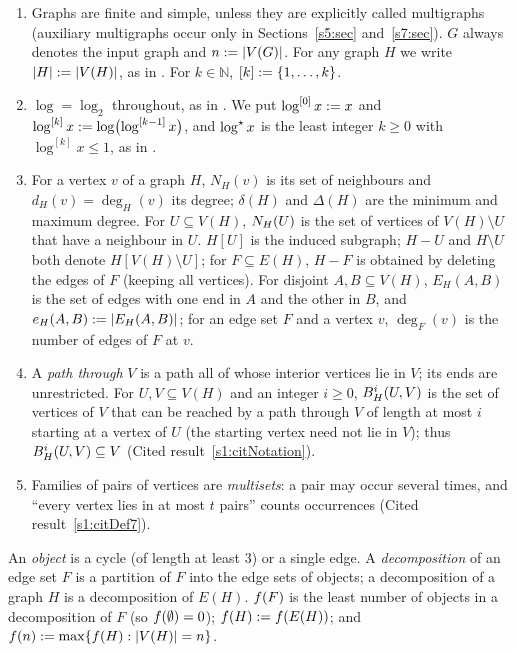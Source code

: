 \begin{convention}\label{s1:convGraphs}
\begin{enumerate}
\item[(a)] Graphs are finite and simple, unless they are explicitly called
multigraphs (auxiliary multigraphs occur only in Sections~\ref{s5:sec}
and~\ref{s7:sec}). $G$ always denotes the input graph and $n\mathrel{:=}|V(G)|$. For
any graph $H$ we write $|H|\mathrel{:=}|V(H)|$, as in \cite{BM}. For $k\in\mathbb N$,
$[k]\mathrel{:=}\{1,\dots,k\}$.
\item[(b)] $\log=\log_2$ throughout, as in \cite{BM}. We put
$\log^{[0]}x\mathrel{:=} x$ and $\log^{[k]}x\mathrel{:=}\log\bigl(\log^{[k-1]}x\bigr)$, and
$\log^{\star} x$ is the least integer $k\ge0$ with $\log^{[k]}x\le1$, as in
\cite{BM}.
\item[(c)] For a vertex $v$ of a graph $H$, $N_H(v)$ is its set of neighbours
and $d_H(v)=\deg_H(v)$ its degree; $\delta(H)$ and $\Delta(H)$ are the minimum
and maximum degree. For $U\subseteq V(H)$, $N_H(U)$ is the set of vertices of
$V(H)\setminus U$ that have a neighbour in $U$. $H[U]$ is the induced subgraph;
$H-U$ and $H\setminus U$ both denote $H[V(H)\setminus U]$; for
$F\subseteq E(H)$, $H-F$ is obtained by deleting the edges of $F$ (keeping all
vertices). For disjoint $A,B\subseteq V(H)$, $E_H(A,B)$ is the set of edges with
one end in $A$ and the other in $B$, and $e_H(A,B)\mathrel{:=}|E_H(A,B)|$; for an
edge set $F$ and a vertex $v$, $\deg_F(v)$ is the number of edges of $F$ at $v$.
\item[(d)] A \emph{path through} $V$ is a path all of whose interior vertices lie
in $V$; its ends are unrestricted. For $U,V\subseteq V(H)$ and an integer
$i\ge0$, $B^{i}_{H}(U,V)$ is the set of vertices of $V$ that can be reached by
a path through $V$ of length at most $i$ starting at a vertex of $U$ (the
starting vertex need not lie in $V$); thus $B^{i}_{H}(U,V)\subseteq V$
(Cited result~\ref{s1:citNotation}).
\item[(e)] Families of pairs of vertices are \emph{multisets}: a pair may occur
several times, and ``every vertex lies in at most $t$ pairs'' counts occurrences
(Cited result~\ref{s1:citDef7}).
\end{enumerate}
\end{convention}

\begin{definition}\label{s1:defObject}
An \emph{object} is a cycle (of length at least $3$) or a single edge. A
\emph{decomposition} of an edge set $F$ is a partition of $F$ into the edge sets
of objects; a decomposition of a graph $H$ is a decomposition of $E(H)$.
$f(F)$ is the least number of objects in a decomposition of $F$ (so
$f(\emptyset)=0$); $f(H)\mathrel{:=}f(E(H))$; and
$f(n)\mathrel{:=}\max\{f(H):|V(H)|=n\}$.
\end{definition}

